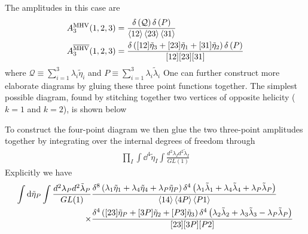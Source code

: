 \documentclass[letter,11pt]{article}
\begin{document}
The amplitudes in this case are
\begin{equation}
	\begin{aligned}
		A_3^{\text{MHV}}(1,2,3)&=\frac{\delta\left(\mathcal Q\right)\delta\left(P\right)}{\expval{12}\expval{23}\expval{31}}\\
		A_3^{\overline{\text{MHV}}}(1,2,3)&=\frac{\delta\left([12]\tilde\eta_3+[23]\tilde\eta_1+[31]\tilde\eta_2\right)\delta\left(P\right)}{[12][23][31]}\\
	\end{aligned}
\end{equation}
where $\mathcal Q\equiv \sum_{i=1}^{3}\lambda_i\tilde\eta_i$ and $P\equiv \sum_{i=1}^{3}\lambda_i\tilde\lambda_i$
One can further construct more elaborate diagrams by gluing these three point functions together.
The simplest possible diagram, found by stitching together two vertices of opposite helicity ($k=1$ and $k=2$), is shown below
\begin{figure}[H]\centering\hspace*{3cm}
\end{figure}
\noindent To construct the four-point diagram we then glue the two three-point amplitudes together by integrating over the internal degrees of freedom through
\begin{equation}
	\begin{aligned}
		\prod_{I}\int \dd^4 \tilde \eta_I \int\frac{d^2\lambda_Id^2\tilde\lambda_I}{GL(1)}
	\end{aligned}
\end{equation}
Explicitly we have
\begin{equation}
	\begin{aligned}
		\int \dd \tilde \eta_{P} \int\frac{d^2\lambda_Pd^2\tilde\lambda_P}{GL(1)}&
		\frac{\delta^{8}\left(\lambda_1\tilde\eta_1+\lambda_{4}\tilde\eta_{4}+\lambda_{P}\tilde\eta_{P}\right)\delta^{4}\left(\lambda_{1}\tilde\lambda_{1}+\lambda_{4}\tilde\lambda_{4}+\lambda_{P}\tilde\lambda_{P}\right)}{\expval{14}\expval{4P}\expval{P1}}\\
		\times&\frac{\delta^{4}\left([23]\tilde\eta_{P}+[3P]\tilde\eta_{2}+[P 3]\tilde\eta_{3}\right)\delta^{4}\left(\lambda_{2}\tilde\lambda_{2}+\lambda_{3}\tilde\lambda_{3}-\lambda_{P}\tilde\lambda_{P}
			\right)}{[23][3P][P2]}
	\end{aligned}
\end{equation}
\end{document}
